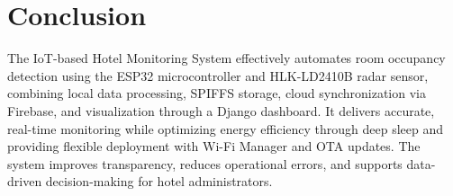 \documentclass[conference]{IEEEtran}
\begin{document}



\section{Conclusion}
\label{sec:conclusion}
The IoT-based Hotel Monitoring System effectively automates room occupancy detection using the ESP32 microcontroller and HLK-LD2410B radar sensor, combining local data processing, SPIFFS storage, cloud synchronization via Firebase, and visualization through a Django dashboard. It delivers accurate, real-time monitoring while optimizing energy efficiency through deep sleep and providing flexible deployment with Wi-Fi Manager and OTA updates. The system improves transparency, reduces operational errors, and supports data-driven decision-making for hotel administrators.
\end{document}
